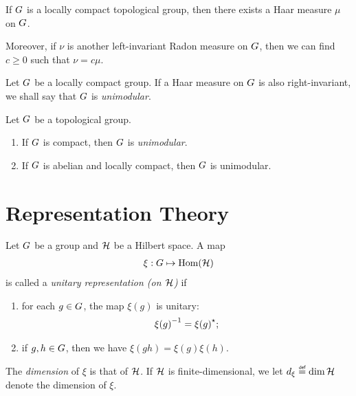 \begin{proposition}
    If $G$ is a locally compact topological group,
    then there exists a Haar measure $\mu$ on $G$.

    Moreover, if $\nu$ is another left-invariant Radon measure on $G$,
    then we can find $c \geq 0$ such that $\nu = c \mu$.
\end{proposition}

\begin{definition}
\label{definition:unimodular_group}
    Let $G$ be a locally compact group.
    If a Haar measure on $G$ is also right-invariant,
    we shall say that $G$ is \emph{unimodular}.
\end{definition}

\begin{proposition}
\label{proposition:sufficient_conditions_to_be_unimodular}
    Let $G$ be a topological group.
    \begin{enumerate}
        \item If $G$ is compact, then $G$ is \emph{unimodular}.
        \item If $G$ is abelian and locally compact, then $G$ is unimodular.
    \end{enumerate}
\end{proposition}

\section{Representation Theory}

\begin{definition}
\label{definition:unitary_representation}
    Let $G$ be a group and $\mathcal{H}$ be a Hilbert space.
    A map
    \begin{align*}
        \xi : G \mapsto \operatorname{Hom}(\mathcal{H})
    \end{align*}
    is called a \emph{unitary representation (on $\mathcal{H}$)} if
    \begin{enumerate}
        \item for each $g \in G$, the map $\xi(g)$ is unitary:
            \begin{align*}
                {\xi(g)}^{-1} = {\xi(g)}^\star;
            \end{align*}
        \item if $g, h \in G$, then we have $\xi(g h) = \xi(g) \xi(h)$.
    \end{enumerate}

    The \emph{dimension} of $\xi$ is that of $\mathcal{H}$.
    If $\mathcal{H}$ is finite-dimensional,
    we let $\dimRep{\xi} \defeq \dim{\Hil}$ denote the dimension of $\xi$.
\end{definition}

